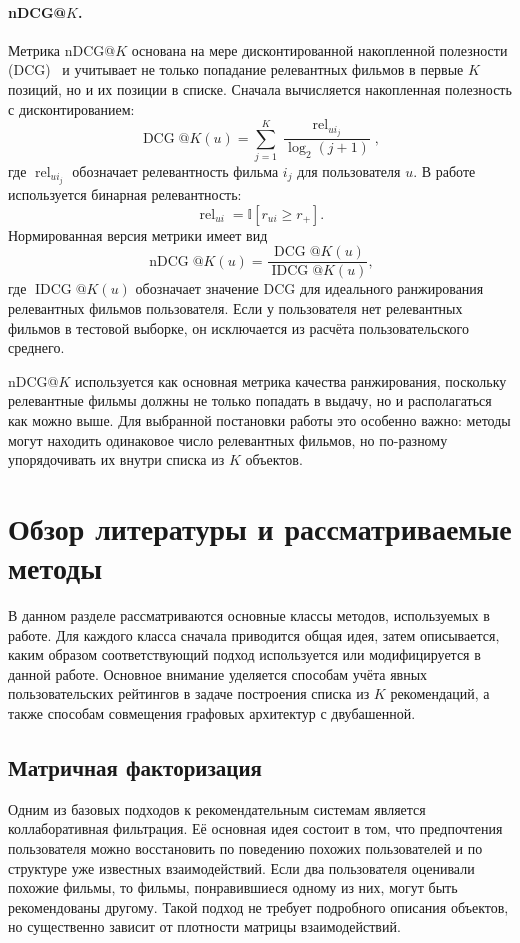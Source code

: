 \documentclass[12pt,fleqn]{article}
\begin{document}
\paragraph{nDCG@$K$.}

Метрика nDCG@$K$ основана на мере дисконтированной накопленной полезности (DCG)~\cite{jarvelin2002dcg} и учитывает не только попадание релевантных фильмов в первые $K$ позиций,
но и их позиции в списке. Сначала вычисляется накопленная полезность с дисконтированием:
$$
    \operatorname{DCG}@K(u)=
    \sum_{j=1}^{K}
    \frac{\operatorname{rel}_{u i_j}}{\log_2(j+1)},
$$
где $\operatorname{rel}_{u i_j}$ обозначает релевантность фильма $i_j$ для
пользователя $u$. В работе используется бинарная релевантность:
$$
    \operatorname{rel}_{ui}=\mathbb{I}[r_{ui}\geq r_{+}].
$$
Нормированная версия метрики имеет вид
$$
    \operatorname{nDCG}@K(u)=
    \frac{\operatorname{DCG}@K(u)}{\operatorname{IDCG}@K(u)},
$$
где $\operatorname{IDCG}@K(u)$ обозначает значение DCG для идеального ранжирования
релевантных фильмов пользователя. Если у пользователя нет релевантных фильмов
в тестовой выборке, он исключается из расчёта пользовательского среднего.

nDCG@$K$ используется как основная метрика качества ранжирования, поскольку
релевантные фильмы должны не только попадать в выдачу, но и располагаться как
можно выше. Для выбранной постановки работы это особенно важно: методы могут находить
одинаковое число релевантных фильмов, но по-разному упорядочивать их внутри
списка из $K$ объектов.

\section{Обзор литературы и рассматриваемые методы}
\label{sec:literature_methods}

В данном разделе рассматриваются основные классы методов, используемых в работе. Для каждого класса сначала
приводится общая идея, затем описывается, каким образом соответствующий подход
используется или модифицируется в данной работе. Основное внимание уделяется
способам учёта явных пользовательских рейтингов в задаче построения списка из $K$ рекомендаций, а также способам совмещения графовых архитектур с двубашенной.

\subsection{Матричная факторизация}

Одним из базовых подходов к рекомендательным системам является коллаборативная
фильтрация. Её основная идея состоит в том, что предпочтения пользователя можно
восстановить по поведению похожих пользователей и по структуре уже известных
взаимодействий. Если два пользователя оценивали похожие фильмы, то фильмы,
понравившиеся одному из них, могут быть рекомендованы другому. Такой подход не
требует подробного описания объектов, но существенно зависит от плотности
матрицы взаимодействий.
\end{document}
